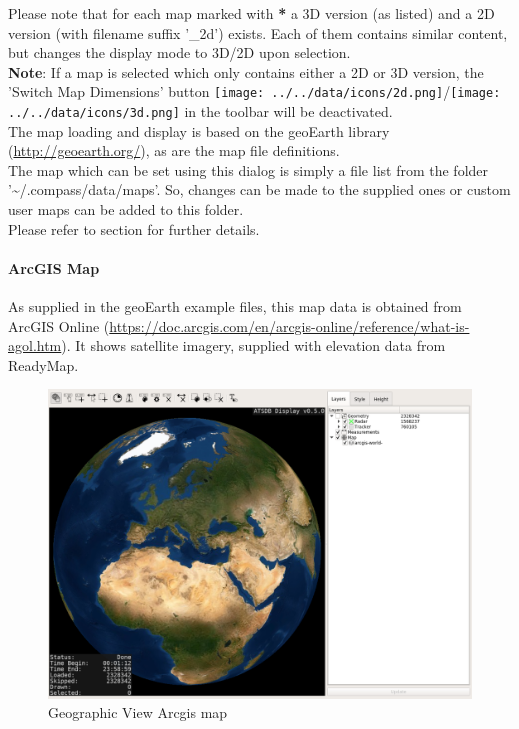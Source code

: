  Please note that for each map marked with \textbf{*} a 3D version (as listed) and a 2D version (with filename suffix '\_2d') exists. Each of them contains similar content, but changes the display mode to 3D/2D upon selection. \\

 \textbf{Note}: If a map is selected which only contains either a 2D or 3D version, 
 the 'Switch Map Dimensions' button \texttt{[image: ../../data/icons/2d.png]}/\texttt{[image: ../../data/icons/3d.png]} in the toolbar will be deactivated.\\
 
The map loading and display is based on the geoEarth library (\url{http://geoearth.org/}), as are the map file definitions.  \\

The map which can be set using this dialog is simply a file list from the folder '\textasciitilde/.compass/data/maps'. So, changes can be made to the supplied ones or custom user maps can be added to this folder. \\
Please refer to section  for further details.

\newpage
\paragraph{ArcGIS Map}

As supplied in the geoEarth example files, this map data is obtained from ArcGIS Online (\url{https://doc.arcgis.com/en/arcgis-online/reference/what-is-agol.htm}). It shows satellite imagery, supplied with elevation data from ReadyMap. 

\begin{figure}[H]
    \hspace*{-2.5cm}
    \includegraphics[width=19cm,frame]{figures/geoview_arcgis.png}
  \caption{Geographic View Arcgis map}
\end{figure}

